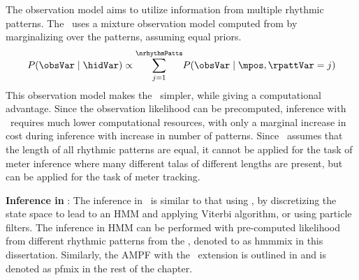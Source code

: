 The observation model aims to utilize information from multiple rhythmic patterns. The \momodel\ uses a mixture observation model computed from  by marginalizing over the patterns, assuming equal priors. 
\begin{equation}\label{eqn:bpmmix:obsmodel}
P(\obsVar \mid \hidVar) \propto \overset{\nrhythmPatts}{\underset{j=1}{\sum}}P(\obsVar \mid \mpos,\rpattVar=j)
\end{equation}
This observation model makes the \momodel\ simpler, while giving a computational advantage. Since the observation likelihood can be precomputed, inference with \momodel\ requires much lower computational resources, with only a marginal increase in cost during inference with increase in number of patterns. Since \momodel\ assumes that the length of all rhythmic patterns are equal, it cannot be applied for the task of meter inference where many different \glspl{tala} of different lengths are present, but can be applied for the task of meter tracking. 

\noindent \textbf{Inference in \momodel}: The inference in \momodel\ is similar to that using \bpmodel, by discretizing the state space to lead to an \gls{HMM} and applying Viterbi algorithm, or using particle filters. The inference in \gls{HMM} can be performed with pre-computed likelihood from different rhythmic patterns from the \momodel, denoted to as \acrshort{hmmmix} in this dissertation. Similarly, the \gls{AMPF} with the \momodel\ extension is outlined in  and is denoted as \acrshort{pfmix} in the rest of the chapter.
